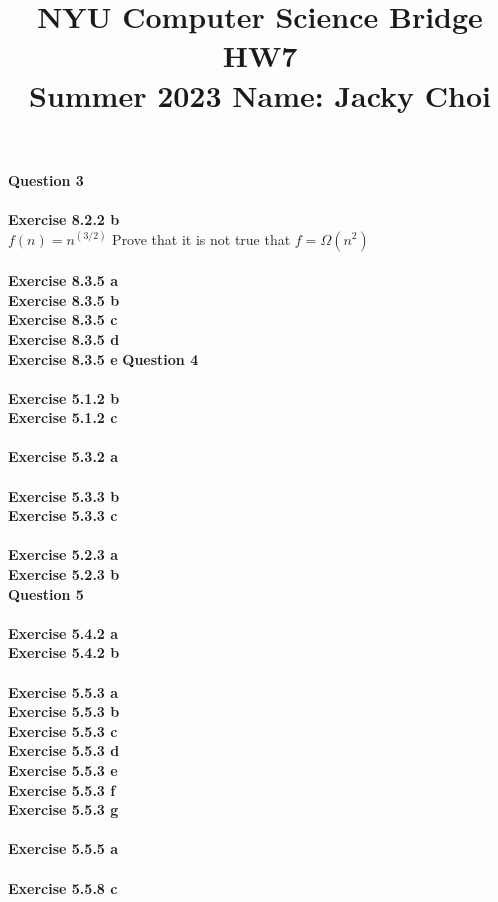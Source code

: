 \documentclass{article}
\title{\textbf{NYU Computer Science Bridge HW7}\\
Summer 2023 Name: Jacky Choi}
\date{}
\begin{document}
\setul{}{2pt}
\maketitle

\noindent \textbf{Question 3}\\\\
\textbf{Exercise 8.2.2 b}\\
$f(n) = n^{(3/2)}$ Prove that it is not true that $f = \Omega(n^2)$\\\\
\textbf{Exercise 8.3.5 a}\\

\textbf{Exercise 8.3.5 b}\\
\textbf{Exercise 8.3.5 c}\\
\textbf{Exercise 8.3.5 d}\\
\textbf{Exercise 8.3.5 e}
\newpage
\noindent \textbf{Question 4}\\\\
\textbf{Exercise 5.1.2 b}\\
\textbf{Exercise 5.1.2 c}\\\\
\textbf{Exercise 5.3.2 a}\\\\
\textbf{Exercise 5.3.3 b}\\
\textbf{Exercise 5.3.3 c}\\\\
\textbf{Exercise 5.2.3 a}\\
\textbf{Exercise 5.2.3 b}\\
\newpage
\noindent \textbf{Question 5}\\\\
\textbf{Exercise 5.4.2 a}\\
\textbf{Exercise 5.4.2 b}\\\\
\textbf{Exercise 5.5.3 a}\\
\textbf{Exercise 5.5.3 b}\\
\textbf{Exercise 5.5.3 c}\\
\textbf{Exercise 5.5.3 d}\\
\textbf{Exercise 5.5.3 e}\\
\textbf{Exercise 5.5.3 f}\\
\textbf{Exercise 5.5.3 g}\\\\
\textbf{Exercise 5.5.5 a}\\\\
\textbf{Exercise 5.5.8 c}\\
\end{document}
